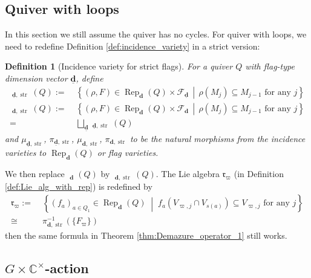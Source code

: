 \documentclass[reqno,11pt]{book}
\numberwithin{equation}{section}
\theoremstyle{plain}
\newtheorem{defn}[theorem]{Definition}
\theoremstyle{plain}
\numberwithin{equation}{section}
\theoremstyle{remark}
\DeclareMathOperator{\Rep}{\operatorname{Rep}}
\DeclareMathOperator{\RRep}{\widetilde{\operatorname{Rep}}}
\DeclareMathOperator{\str}{\operatorname{str}}
\newcommand{\dimvec}[1]{\mathbf{#1}}
\newcommand{\ftdimvec}[1]{\underline{\dimvec{#1}}}
\newcommand{\ww}{\varpi}
\begin{document}
\subsection{Quiver with loops}
In this section we still assume the quiver has no cycles. For quiver with loops, we need to redefine Definition \ref{def:incidence_variety} in a strict version:
\begin{defn}[Incidence variety for strict flags]\label{def:incidence_variety_str}
For a quiver $Q$ with flag-type dimension vector $\ftdimvec{d}$, define
\begin{equation*}
\begin{aligned}
  \RRep_{\ftdimvec{d},\str}(Q):=\;& \left\{ (\rho,F) \in \Rep_{\dimvec{d}}(Q) \times \mathcal{F}_{\ftdimvec{d}}  \,\middle|\, \rho(M_j) \subseteq M_{j-1} \text{ for any } j \right\} \\
  \RRep_{\dimvec{d},\str}(Q):=\;& \left\{ (\rho,F) \in \Rep_{\dimvec{d}}(Q) \times \mathcal{F}_{\dimvec{d}}  \,\middle|\, \rho(M_j) \subseteq M_{j-1} \text{ for any } j \right\} \\
  =\;& \bigsqcup_{\ftdimvec{d}} \RRep_{\ftdimvec{d},\str}(Q)
\end{aligned}
\end{equation*}
and $\mu_{\ftdimvec{d},\str}$, $\pi_{\ftdimvec{d},\str}$, $\mu_{\dimvec{d},\str}$, $\pi_{\dimvec{d},\str}$ to be the natural morphisms from the incidence varieties to $\Rep_{\dimvec{d}}(Q)$ or flag varieties.
\end{defn}
We then replace $\RRep_{\dimvec{d}}(Q)$ by $\RRep_{\dimvec{d},\str}(Q)$. The Lie algebra $\mathfrak{r}_{\ww}$ (in Definition \ref{def:Lie_alg_with_rep}) is redefined by
\begin{equation*}
\begin{aligned}
  \mathfrak{r}_{\ww}:=\;& \left\{ (f_a)_{a\in Q_1} \in \Rep_{\dimvec{d}}(Q) \;\middle| \;  f_a(V_{\ww,j} \cap V_{s(a)}) \subseteq V_{\ww,j} \text{ for any } j \right\}\\
  \cong\;& \pi_{\dimvec{d},\str}^{-1}(\{F_{\ww} \})
\end{aligned}
\end{equation*}
then the same formula in Theorem \ref{thm:Demazure_operator_1} still works.
\subsection{$G \times \mathbb{C}^{\times}$-action}\label{subsec:Cstar_action}
\end{document}
